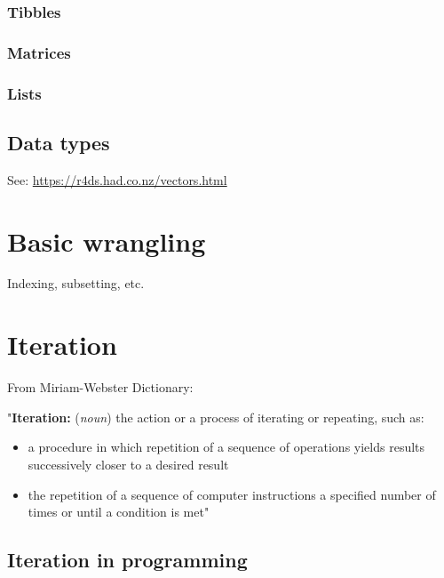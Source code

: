 \documentclass[
]{book}
\providecommand{\tightlist}{%
  \setlength{\itemsep}{0pt}\setlength{\parskip}{0pt}}
\begin{document}
\hypertarget{tibbles}{%
\subsection{Tibbles}\label{tibbles}}

\hypertarget{matrices}{%
\subsection{Matrices}\label{matrices}}

\hypertarget{lists}{%
\subsection{Lists}\label{lists}}

\hypertarget{data-types}{%
\section{Data types}\label{data-types}}

See: \url{https://r4ds.had.co.nz/vectors.html}

\hypertarget{basic-wrangling}{%
\chapter{Basic wrangling}\label{basic-wrangling}}

Indexing, subsetting, etc.

\hypertarget{iteration}{%
\chapter{Iteration}\label{iteration}}

From Miriam-Webster Dictionary:

"\textbf{Iteration:} (\emph{noun}) the action or a process of iterating or repeating, such as:

\begin{itemize}
\tightlist
\item
  a procedure in which repetition of a sequence of operations yields results successively closer to a desired result
\item
  the repetition of a sequence of computer instructions a specified number of times or until a condition is met"
\end{itemize}

\hypertarget{iteration-in-programming}{%
\section{Iteration in programming}\label{iteration-in-programming}}
\end{document}

